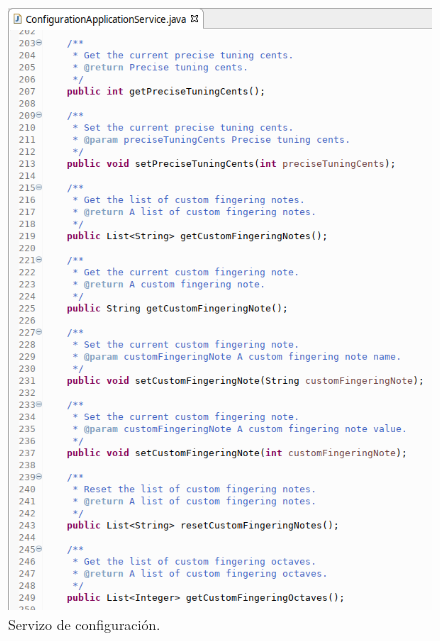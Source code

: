    \begin{figure}[htbp]
    \centering
    \includegraphics[scale=0.6, keepaspectratio=true]{./imagenes/servizo-configuracion-5.png}
    \caption{Servizo de configuración.}
    \label{figura:ServizoConfiguracion5}
   \end{figure}
   
